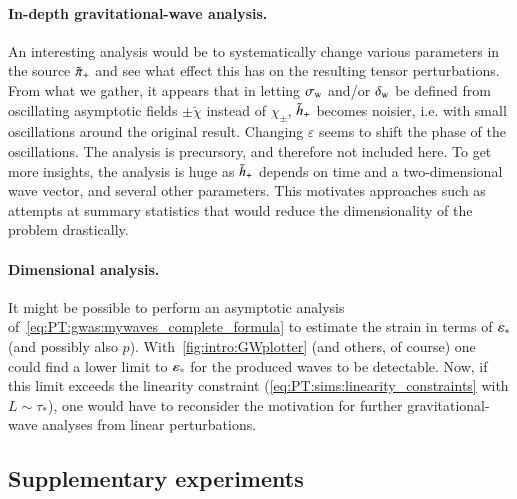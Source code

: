 \paragraph{In-depth gravitational-wave analysis.} %
An interesting analysis would be to systematically change various parameters in the source $\tilde{\pi}_+$ and see what effect this has on the resulting tensor perturbations. From what we gather, it appears that in letting $\sigma_\mathrm{w}$ and/or $\delta_\mathrm{w}$ be defined from oscillating asymptotic fields $\pm \breve{\chi}$ instead of $\chi_\pm$, $\tilde{h}_+$ becomes noisier, i.e. with small oscillations around the original result. Changing $\varepsilon$ seems to shift the phase of the oscillations. The analysis is precursory, and therefore not included here. %
To get more insights, the analysis is huge as $\tilde{h}_+$ depends on time and a two-dimensional wave vector, and several other parameters. This motivates approaches such as attempts at summary statistics that would reduce the dimensionality of the problem drastically. 



\paragraph{Dimensional analysis.} %
It might be possible to perform an asymptotic analysis of~\cref{eq:PT:gwas:mywaves_complete_formula} to estimate the strain in terms of $\varepsilon_\ast$ (and possibly also $p$). With~\cref{fig:intro:GWplotter} (and others, of course) one could find a lower limit to $\varepsilon_\ast$ for the produced waves to be detectable. Now, if this limit exceeds the linearity constraint (\cref{eq:PT:sims:linearity_constraints} with $L\sim \tau_\ast$), one would have to reconsider the motivation for further gravitational-wave analyses from linear perturbations.



\subsection{Supplementary experiments}\label{sec:whatif:cont:extra_sims}





